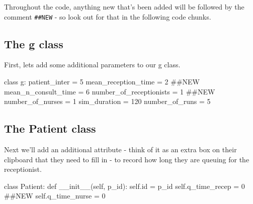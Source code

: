 \documentclass[
  letterpaper,
  DIV=11,
  numbers=noendperiod]{scrreprt}
\newenvironment{Shaded}{}{}
\newcommand{\BuiltInTok}[1]{\textcolor[rgb]{0.84,0.23,0.29}{#1}}
\newcommand{\CommentTok}[1]{\textcolor[rgb]{0.42,0.45,0.49}{#1}}
\newcommand{\DecValTok}[1]{\textcolor[rgb]{0.00,0.36,0.77}{#1}}
\newcommand{\FunctionTok}[1]{\textcolor[rgb]{0.44,0.26,0.76}{#1}}
\newcommand{\KeywordTok}[1]{\textcolor[rgb]{0.84,0.23,0.29}{#1}}
\newcommand{\NormalTok}[1]{\textcolor[rgb]{0.14,0.16,0.18}{#1}}
\newcommand{\OperatorTok}[1]{\textcolor[rgb]{0.14,0.16,0.18}{#1}}
\newcommand{\VariableTok}[1]{\textcolor[rgb]{0.89,0.38,0.04}{#1}}
\begin{document}
\begin{tcolorbox}[enhanced jigsaw, colframe=quarto-callout-tip-color-frame, bottomtitle=1mm, breakable, rightrule=.15mm, coltitle=black, colbacktitle=quarto-callout-tip-color!10!white, opacityback=0, leftrule=.75mm, arc=.35mm, toptitle=1mm, title=\textcolor{quarto-callout-tip-color}{\faLightbulb}\hspace{0.5em}{Tip}, titlerule=0mm, colback=white, toprule=.15mm, bottomrule=.15mm, left=2mm, opacitybacktitle=0.6]

Throughout the code, anything new that's been added will be followed by
the comment \texttt{\#\#NEW} - so look out for that in the following
code chunks.

\end{tcolorbox}

\subsection{The g class}\label{the-g-class}

First, lets add some additional parameters to our g class.

\begin{Shaded}
\begin{Highlighting}[]
\KeywordTok{class}\NormalTok{ g:}
\NormalTok{    patient\_inter }\OperatorTok{=} \DecValTok{5}
\NormalTok{    mean\_reception\_time }\OperatorTok{=} \DecValTok{2} \CommentTok{\#\#NEW}
\NormalTok{    mean\_n\_consult\_time }\OperatorTok{=} \DecValTok{6}
\NormalTok{    number\_of\_receptionists }\OperatorTok{=} \DecValTok{1} \CommentTok{\#\#NEW}
\NormalTok{    number\_of\_nurses }\OperatorTok{=} \DecValTok{1}
\NormalTok{    sim\_duration }\OperatorTok{=} \DecValTok{120}
\NormalTok{    number\_of\_runs }\OperatorTok{=} \DecValTok{5}
\end{Highlighting}
\end{Shaded}

\subsection{The Patient class}\label{the-patient-class}

Next we'll add an additional attribute - think of it as an extra box on
their clipboard that they need to fill in - to record how long they are
queuing for the receptionist.

\begin{Shaded}
\begin{Highlighting}[]
\KeywordTok{class}\NormalTok{ Patient:}
    \KeywordTok{def} \FunctionTok{\_\_init\_\_}\NormalTok{(}\VariableTok{self}\NormalTok{, p\_id):}
        \VariableTok{self}\NormalTok{.}\BuiltInTok{id} \OperatorTok{=}\NormalTok{ p\_id}
        \VariableTok{self}\NormalTok{.q\_time\_recep }\OperatorTok{=} \DecValTok{0} \CommentTok{\#\#NEW}
        \VariableTok{self}\NormalTok{.q\_time\_nurse }\OperatorTok{=} \DecValTok{0}
\end{Highlighting}
\end{Shaded}
\end{document}
